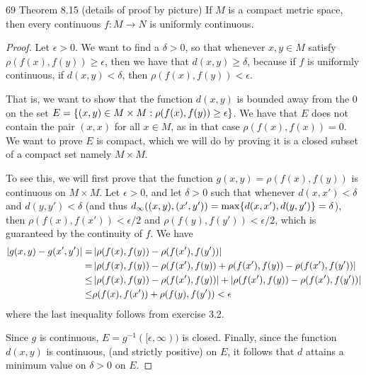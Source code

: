 \begin{exercise}{69 Theorem 8.15 (details of proof by picture)}
If $M$ is a compact metric space, then every continuous $f:M\to N$ is uniformly continuous.
\end{exercise}
\begin{proof}
Let $\epsilon>0$.
We want to find a $\delta > 0$, so that whenever $x,y\in M$ satisfy $\rho(f(x),f(y)) \geq \epsilon$, then we have that $d(x,y) \geq \delta$, because if $f$ is uniformly continuous, if $d(x,y) < \delta$, then $\rho(f(x),f(y)) < \epsilon$.

That is, we want to show that the function $d(x,y)$ is bounded away from the 0 on the set $E=\{(x,y) \in M \times M : \rho(f(x),f(y)) \geq \epsilon\}$.
We have that $E$ does not contain the pair $(x,x)$ for all $x\in M$, as in that case $\rho(f(x),f(x)) = 0$.
We want to prove $E$ is compact, which we will do by proving it is a closed subset of a compact set namely $M\times M$.

To see this, we will first prove that the function $g(x,y) = \rho(f(x),f(y))$ is continuous on $M \times M$.
Let $\epsilon>0$, and let $\delta >0$ such that whenever $d(x,x')<\delta$ and $d(y,y')<\delta$ (and thus $d_\infty((x,y), (x',y')) = \max\{d(x,x'), d(y,y')\} = \delta$), then $\rho(f(x),f(x'))<\epsilon/2$ and $\rho(f(y),f(y'))<\epsilon/2$, which is guaranteed by the continuity of $f$.
We have 
\begin{align*}
    \left\lvert g(x,y)- g(x',y')\right\rvert
    =& \left\lvert \rho(f(x),f(y)) - \rho(f(x'),f(y'))\right\rvert\\
    =& \left\lvert \rho(f(x),f(y)) - \rho(f(x'),f(y))
    + \rho(f(x'),f(y)) - \rho(f(x'),f(y'))\right\rvert\\
    \leq& \left\lvert \rho(f(x),f(y)) - \rho(f(x'),f(y))\right\rvert
    + \left\lvert \rho(f(x'),f(y)) - \rho(f(x'),f(y'))\right\rvert\\
    \leq& \rho(f(x),f(x')) + \rho(f(y),f(y')) < \epsilon
\end{align*}
where the last inequality follows from exercise 3.2.

Since $g$ is continuous, $E=g^{-1}([\epsilon, \infty))$ is closed.
Finally, since the function $d(x,y)$ is continuous, (and strictly positive) on $E$, it follows that $d$ attains a minimum value on $\delta>0$ on $E$.
\end{proof} 

